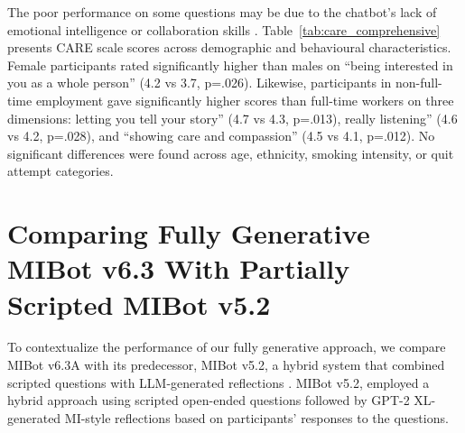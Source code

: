 The poor performance on some questions may be due to the chatbot's lack of emotional intelligence \citep{sabour-etal-2024-emobench} or collaboration skills \citep{yang-etal-2024-human}. Table~\ref{tab:care_comprehensive} presents CARE scale scores across demographic and behavioural characteristics. Female participants rated significantly higher than males on ``being interested in you as a whole person'' (4.2 vs 3.7, p=.026). Likewise, participants in non-full-time employment gave significantly higher scores than full-time workers on three dimensions: letting you tell your story'' (4.7 vs 4.3, p=.013), really listening'' (4.6 vs 4.2, p=.028), and ``showing care and compassion'' (4.5 vs 4.1, p=.012). 
No significant differences were found across age, ethnicity, smoking intensity, or quit attempt categories. 







\section{Comparing Fully Generative MIBot v6.3 With Partially Scripted MIBot v5.2}
\label{sec:comparison-v52}

To contextualize the performance of our fully generative approach, we compare MIBot v6.3A with its predecessor, MIBot v5.2, a hybrid system that combined scripted questions with LLM-generated reflections \citep{brown2023mi}. MIBot v5.2, employed a hybrid approach using scripted open-ended questions followed by GPT-2 XL-generated MI-style reflections based on participants' responses to the questions.

